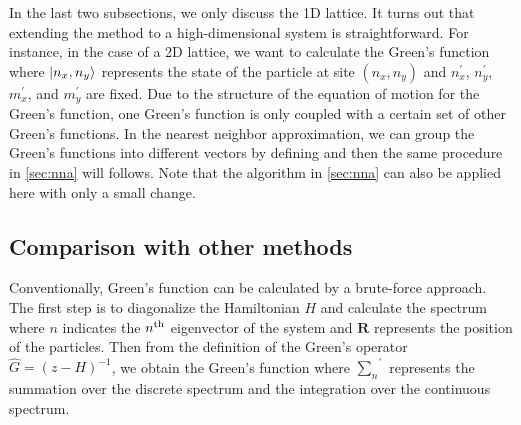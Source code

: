 In the last two subsections, we only discuss the 1D lattice. It turns out that extending the method to a high-dimensional system is 
straightforward. For instance, in the case of a 2D lattice, we 
want to calculate the Green's function 
where $| n_x, n_y \rangle$ represents the state of the particle at site $(n_x, n_y)$ and $n_x^{\prime}$, $n_y^{\prime}$,
$m_x^{\prime}$, and $m_y^{\prime}$ are fixed. Due to the structure of the equation of  
motion for the Green's function, one Green's function is only coupled with a certain set of other Green's functions. In the
nearest neighbor approximation, we can group the Green's functions into different vectors by defining
and then the same procedure in \autoref{sec:nna} will follows. Note that the algorithm in \autoref{sec:nna} can also
be applied here with only a small change.  

\subsection{Comparison with other methods}
\label{sec:comparison}

Conventionally, Green's function can be calculated by a brute-force approach. The first step is to diagonalize the 
Hamiltonian $H$ and calculate the spectrum
where $n$ indicates the $n^{\rm th}$ eigenvector of the system and $\mathbf{R}$ represents the position of the
particles. Then from the definition of the Green's operator $\hat{G} = (z-H)^{-1}$, we obtain the Green's function
where ${\sum_{n}}^{\prime}$ represents  the summation over the discrete spectrum and the integration over the
 continuous spectrum. 

